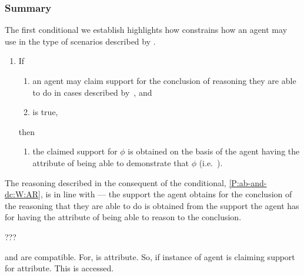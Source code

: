 \subsubsection{Summary}
\label{sec:uRa-and-wr-summary}

\begin{note}[Conditional A]
  The first conditional we establish highlights how \uRa{} constrains how an agent may use \gsi{} in the type of scenarios described by \eA{}.

  \begin{proposition}[\mcA{}]
  \begin{enumerate}[label=(C\Alph*), ref=(C\Alph*)]
  \item\label{P:ab-and-dc:W} If
    \begin{enumerate}[label=(\roman*), ref=(CA.\roman*)]
    \item\label{P:ab-and-dc:W:ab} an agent may claim support for the conclusion of reasoning they are able to do in cases described by~\eA{}, and
    \item\label{P:ab-and-dc:W:uRa} \uRa{} is true,
    \end{enumerate}
    then
    \begin{enumerate}[label=(\roman*), ref=(CA.\roman*), resume]
    \item\label{P:ab-and-dc:W:AR} the claimed support for \(\phi\) is obtained on the basis of the agent having the attribute of being able to demonstrate that \(\phi\) (i.e.\ \AR{}).
    \end{enumerate}
  \end{enumerate}
\end{proposition}

  The reasoning described in the consequent of the conditional, \ref{P:ab-and-dc:W:AR}, is in line with \AR{} --- the support the agent obtains for the conclusion of the reasoning that they are able to do is obtained from the support the agent has for having the attribute of being able to reason to the conclusion.
\end{note}

\begin{note}[Summarising]
  ???
\end{note}

\begin{note}
  \AR{} and \uRa{} are compatible.
  For, \AR{} is attribute.
  So, if instance of \AR{} agent is claiming support for attribute.
  This is accessed.
\end{note}

